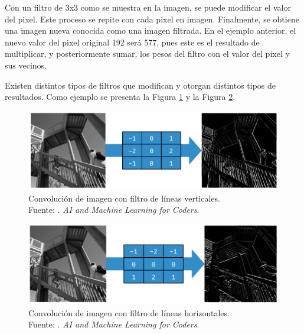 Con un filtro de 3x3 como se muestra en la imagen, se puede modificar el valor del pixel. Este proceso se repite con cada pixel en imagen. Finalmente, se obtiene una imagen nueva conocida como una imagen filtrada. \parencite{bk_moroney2020aiandml} En el ejemplo anterior, el nuevo valor del pixel original 192 será 577, pues este es el resultado de multiplicar, y posteriormente sumar, los pesos del filtro con el valor del pixel y sus vecinos.

Existen distintos tipos de filtros que modifican y otorgan distintos tipos de resultados. Como ejemplo se presenta la Figura \ref{2:fig202} y la Figura \ref{2:fig203}.

\begin{figure}[H]
	\begin{center}
		\includegraphics[width=1.00\textwidth]{2/figures/cnn_filtro_vert.png}
		\caption[Convolución de imagen con filtro de líneas verticales]{Convolución de imagen con filtro de líneas verticales. \\
		Fuente: \cite{bk_moroney2020aiandml}. \textit{AI and Machine Learning for Coders}.}
		\label{2:fig202}
	\end{center}
\end{figure}

\begin{figure}[H]
	\begin{center}
		\includegraphics[width=1.00\textwidth]{2/figures/cnn_filtro_hori.png}
		\caption[Convolución de imagen con filtro de líneas horizontales]{Convolución de imagen con filtro de líneas horizontales. \\
		Fuente: \cite{bk_moroney2020aiandml}. \textit{AI and Machine Learning for Coders}.}
		\label{2:fig203}
	\end{center}
\end{figure}

